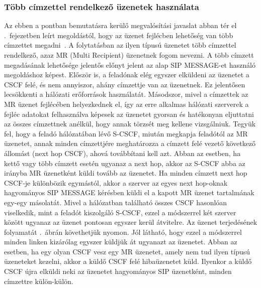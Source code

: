 \subsubsection{Több címzettel rendelkező üzenetek használata}
\label{sec:mr_message}

Az ebben a pontban bemutatásra kerülő megvalósítási javaslat abban tér el .~fejezetben leírt megoldástól, hogy az üzenet fejlécben lehetőség van több címzettet megadni~\cite{springer_group_messaging}. A folytatásban az ilyen típusú üzenetet több címzettel rendelkező, azaz MR (Multi Recipient) üzenetnek fogom nevezni. A több címzett megadásának lehetősége jelentős előnyt jelent az alap SIP MESSAGE-et használó megoldáshoz képest. Először is, a feladónak elég egyszer elküldeni az üzenetet a CSCF felé, és nem annyiszor, ahány címzettje van az üzenetnek. Ez jelentősen lecsökkenti a hálózati erőforrások használatát. Másodszor, mivel a címzettek az MR üzenet fejlécében helyezkednek el, így az erre alkalmas hálózati szerverek a fejléc adatokat felhasználva képesek az üzenetet gyorsan és hatékonyan eljuttatni az összes címzettnek anélkül, hogy annak törzsét meg kellene vizsgálniuk. Tegyük fel, hogy a feladó hálózatában lévő S-CSCF, miután megkapja feladótól az MR üzenetet, annak minden címzettjére meghatározza a címzett felé vezető következő állomást (next hop CSCF), ahová továbbítani kell azt. Abban az esetben, ha kettő vagy több címzett esetén ugyanaz a next hop, akkor az S-CSCF abba az irányba MR üzenetként küldi tovább az üzenetet. Ha minden címzett next hop CSCF-je különbözik egymástól, akkor a szerver az egyes next hop-oknak hagyományos SIP MESSAGE kérésben küldi el a kapott MR üzenet tartalmának egy-egy másolatát. Mivel a hálózatban található összes CSCF hasonlóan viselkedik, mint a feladót kiszolgáló S-CSCF, ezzel a módszerrel két szerver között ugyanaz az üzenet pontosan egyszer kerül átvitelre. Az üzenet terjedésének folyamatát .~ábrán követhetjük nyomon. Jól látható, hogy ezzel a módszerrel minden linken kizárólag egyszer küldjük át ugyanazt az üzenetet. Abban az esetben, ha egy olyan CSCF vesz egy MR üzenetet, amely nem tud ilyen típusú üzeneteket kezelni, akkor a küldő CSCF felé hibaüzenetet küld. Ilyenkor a küldő CSCF újra elküldi neki az üzenetet hagyományos SIP üzenetként, minden címzettre külön-külön. 

